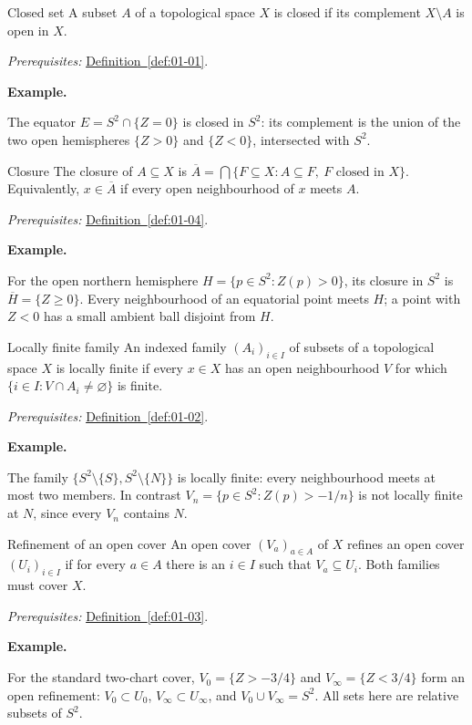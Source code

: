 \documentclass[11pt]{article}
\makeatletter
\newcounter{definition}
\newcommand{\exampleheading}{\par\medskip\textbf{Example.}\par\smallskip}
\newcommand{\currentdefinition}[1]{\protected@edef\@currentlabel{#1}}
\makeatother
\begin{document}
\begin{definitionbox}{Closed set}
\currentdefinition{\thedefinition}
\label{def:01-04}
A subset $A$ of a topological space $X$ is closed if its complement $X\setminus A$ is open in $X$.

\smallskip
\textit{Prerequisites:} \hyperref[def:01-01]{Definition~\ref*{def:01-01}}.

\exampleheading
The equator $E=S^2\cap\{Z=0\}$ is closed in $S^2$: its complement is the union of the two open hemispheres $\{Z>0\}$ and $\{Z<0\}$, intersected with $S^2$.
\end{definitionbox}

\begin{definitionbox}{Closure}
\currentdefinition{\thedefinition}
\label{def:01-05}
The closure of $A\subseteq X$ is $\overline A=\bigcap\{F\subseteq X:A\subseteq F,\ F\text{ closed in }X\}$. Equivalently, $x\in\overline A$ if every open neighbourhood of $x$ meets $A$.

\smallskip
\textit{Prerequisites:} \hyperref[def:01-04]{Definition~\ref*{def:01-04}}.

\exampleheading
For the open northern hemisphere $H=\{p\in S^2:Z(p)>0\}$, its closure in $S^2$ is $\overline H=\{Z\ge0\}$. Every neighbourhood of an equatorial point meets $H$; a point with $Z<0$ has a small ambient ball disjoint from $H$.
\end{definitionbox}

\begin{definitionbox}{Locally finite family}
\currentdefinition{\thedefinition}
\label{def:12-01}
An indexed family $(A_i)_{i\in I}$ of subsets of a topological space $X$ is locally finite if every $x\in X$ has an open neighbourhood $V$ for which $\{i\in I:V\cap A_i\ne\varnothing\}$ is finite.

\smallskip
\textit{Prerequisites:} \hyperref[def:01-02]{Definition~\ref*{def:01-02}}.

\exampleheading
The family $\{S^2\setminus\{S\},S^2\setminus\{N\}\}$ is locally finite: every neighbourhood meets at most two members. In contrast $V_n=\{p\in S^2:Z(p)>-1/n\}$ is not locally finite at $N$, since every $V_n$ contains $N$.
\end{definitionbox}

\begin{definitionbox}{Refinement of an open cover}
\currentdefinition{\thedefinition}
\label{def:12-02}
An open cover $(V_a)_{a\in A}$ of $X$ refines an open cover $(U_i)_{i\in I}$ if for every $a\in A$ there is an $i\in I$ such that $V_a\subseteq U_i$. Both families must cover $X$.

\smallskip
\textit{Prerequisites:} \hyperref[def:01-03]{Definition~\ref*{def:01-03}}.

\exampleheading
For the standard two-chart cover, $V_0=\{Z>-3/4\}$ and $V_\infty=\{Z<3/4\}$ form an open refinement: $V_0\subset U_0$, $V_\infty\subset U_\infty$, and $V_0\cup V_\infty=S^2$. All sets here are relative subsets of $S^2$.
\end{definitionbox}
\end{document}
